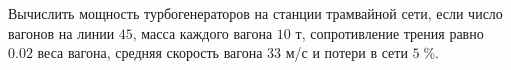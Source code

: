 Вычислить мощность турбогенераторов на станции трамвайной сети, если
число вагонов на линии $45$, масса каждого вагона $10$ т, сопротивление
трения равно $0.02$ веса вагона, средняя скорость вагона $33$ м/с и
потери в сети $5\;\%$.
